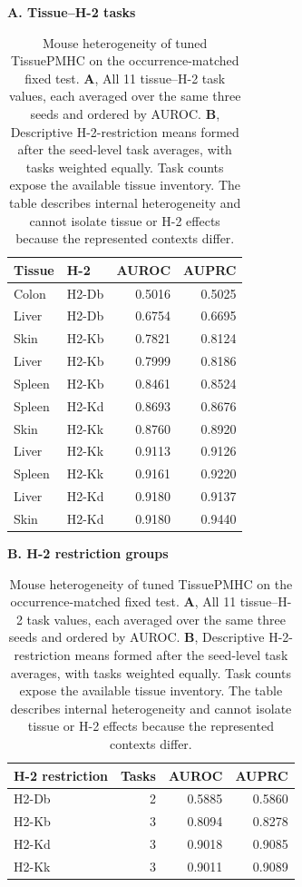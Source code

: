 \begin{table}[t]
\centering
\caption{Mouse heterogeneity of tuned TissuePMHC on the occurrence-matched fixed test. \textbf{A}, All 11 tissue--H-2 task values, each averaged over the same three seeds and ordered by AUROC. \textbf{B}, Descriptive H-2-restriction means formed after the seed-level task averages, with tasks weighted equally. Task counts expose the available tissue inventory. The table describes internal heterogeneity and cannot isolate tissue or H-2 effects because the represented contexts differ.}
\label{tab:mouse-task-detail-new}
\footnotesize
\begin{minipage}[t]{0.57\textwidth}
\textbf{A. Tissue--H-2 tasks}\par\smallskip
\begin{tabularx}{\linewidth}{>{\raggedright\arraybackslash}Xlrr}
\toprule
Tissue & H-2 & AUROC & AUPRC \\
\midrule
Colon & H2-Db & 0.5016 & 0.5025 \\
Liver & H2-Db & 0.6754 & 0.6695 \\
Skin & H2-Kb & 0.7821 & 0.8124 \\
Liver & H2-Kb & 0.7999 & 0.8186 \\
Spleen & H2-Kb & 0.8461 & 0.8524 \\
Spleen & H2-Kd & 0.8693 & 0.8676 \\
Skin & H2-Kk & 0.8760 & 0.8920 \\
Liver & H2-Kk & 0.9113 & 0.9126 \\
Spleen & H2-Kk & 0.9161 & 0.9220 \\
Liver & H2-Kd & 0.9180 & 0.9137 \\
Skin & H2-Kd & 0.9180 & 0.9440 \\
\bottomrule
\end{tabularx}
\end{minipage}
\hfill
\begin{minipage}[t]{0.35\textwidth}
\textbf{B. H-2 restriction groups}\par\smallskip
\centering
\begin{tabular}{lrrr}
\toprule
H-2 restriction & Tasks & AUROC & AUPRC \\
\midrule
H2-Db & 2 & 0.5885 & 0.5860 \\
H2-Kb & 3 & 0.8094 & 0.8278 \\
H2-Kd & 3 & 0.9018 & 0.9085 \\
H2-Kk & 3 & 0.9011 & 0.9089 \\
\bottomrule
\end{tabular}
\end{minipage}
\end{table}

